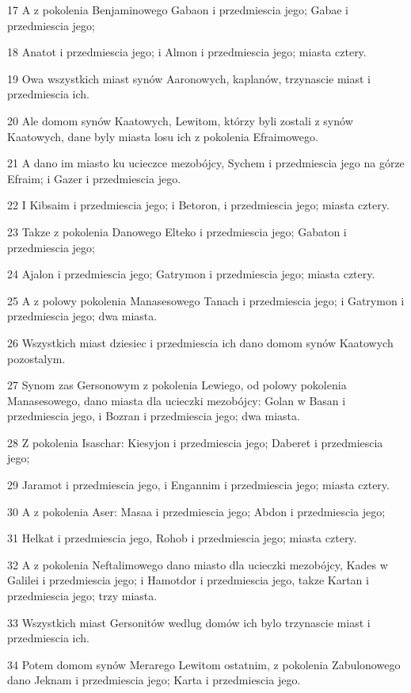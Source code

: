 \par 17 A z pokolenia Benjaminowego Gabaon i przedmiescia jego; Gabae i przedmiescia jego;
\par 18 Anatot i przedmiescia jego; i Almon i przedmiescia jego; miasta cztery.
\par 19 Owa wszystkich miast synów Aaronowych, kaplanów, trzynascie miast i przedmiescia ich.
\par 20 Ale domom synów Kaatowych, Lewitom, którzy byli zostali z synów Kaatowych, dane byly miasta losu ich z pokolenia Efraimowego.
\par 21 A dano im miasto ku ucieczce mezobójcy, Sychem i przedmiescia jego na górze Efraim; i Gazer i przedmiescia jego.
\par 22 I Kibsaim i przedmiescia jego; i Betoron, i przedmiescia jego; miasta cztery.
\par 23 Takze z pokolenia Danowego Elteko i przedmiescia jego; Gabaton i przedmiescia jego;
\par 24 Ajalon i przedmiescia jego; Gatrymon i przedmiescia jego; miasta cztery.
\par 25 A z polowy pokolenia Manasesowego Tanach i przedmiescia jego; i Gatrymon i przedmiescia jego; dwa miasta.
\par 26 Wszystkich miast dziesiec i przedmiescia ich dano domom synów Kaatowych pozostalym.
\par 27 Synom zas Gersonowym z pokolenia Lewiego, od polowy pokolenia Manasesowego, dano miasta dla ucieczki mezobójcy: Golan w Basan i przedmiescia jego, i Bozran i przedmiescia jego; dwa miasta.
\par 28 Z pokolenia Isaschar: Kiesyjon i przedmiescia jego; Daberet i przedmiescia jego;
\par 29 Jaramot i przedmiescia jego, i Engannim i przedmiescia jego; miasta cztery.
\par 30 A z pokolenia Aser: Masaa i przedmiescia jego; Abdon i przedmiescia jego;
\par 31 Helkat i przedmiescia jego, Rohob i przedmiescia jego; miasta cztery.
\par 32 A z pokolenia Neftalimowego dano miasto dla ucieczki mezobójcy, Kades w Galilei i przedmiescia jego; i Hamotdor i przedmiescia jego, takze Kartan i przedmiescia jego; trzy miasta.
\par 33 Wszystkich miast Gersonitów wedlug domów ich bylo trzynascie miast i przedmiescia ich.
\par 34 Potem domom synów Merarego Lewitom ostatnim, z pokolenia Zabulonowego dano Jeknam i przedmiescia jego; Karta i przedmiescia jego.
